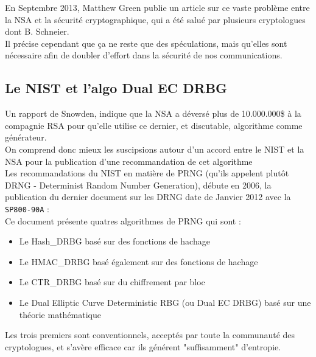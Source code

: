	En Septembre 2013, Matthew Green publie un article \cite{green2013NSA}
	sur ce vaste problème entre la NSA et la sécurité cryptographique, qui
	a été salué par plusieurs cryptologues dont B. Schneier.\\
	
	Il précise cependant que ça ne reste que des spéculations, mais
	qu'elles sont nécessaire afin de doubler d'effort dans la sécurité
	de nos communications.\\


	\subsection{Le NIST et l'algo Dual EC DRBG}
	
	Un rapport de Snowden, indique que la NSA a déversé plus de 10.000.000\$ à 
	la compagnie RSA \cite{ravi2013NSA} pour qu'elle utilise ce dernier, 
	et discutable, algorithme comme générateur. \\
	
	On comprend donc mieux les suscipsions autour d'un accord entre le NIST et 
	la NSA pour la publication d'une recommandation de cet algorithme\\	
	
	Les recommandations du NIST en matière de PRNG (qu'ils appelent plutôt 
	DRNG - Determinist Random Number Generation), débute en 2006, la 
	publication du dernier document sur les DRNG date de Janvier 2012 avec la 
	\texttt{SP800-90A} \cite{nist800-90A}:\\

	Ce document présente quatres algorithmes de PRNG qui sont :\\ 
	\begin{itemize}
		\item Le Hash\_DRBG basé sur des fonctions de hachage
		\item Le HMAC\_DRBG basé également sur des fonctions de hachage
		\item Le CTR\_DRBG basé sur du chiffrement par bloc
		\item Le Dual Elliptic Curve Deterministic RBG (ou Dual EC DRBG) basé 
		sur une théorie mathématique\\
	\end{itemize}

	Les trois premiers sont conventionnels, acceptés par toute la communauté 
	des cryptologues, et s'avère efficace car ils générent "suffisamment" 
	d'entropie.\\
	
